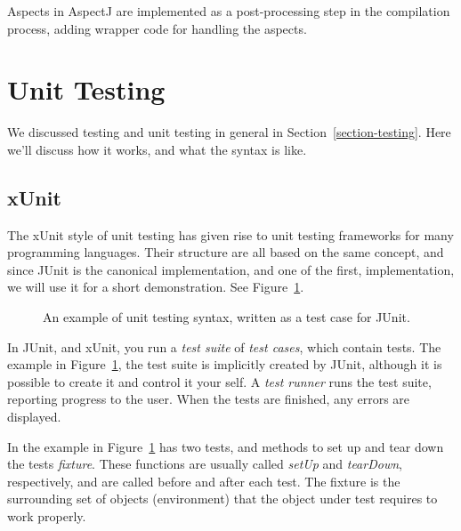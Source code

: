 \documentclass[a4paper,11pt]{kth-mag}
\begin{document}
Aspects in AspectJ are implemented as a post-processing step in the compilation
process, adding wrapper code for handling the aspects.


\section{Unit Testing} \label{section-unit-testing}

We discussed testing and unit testing in general in
Section~\ref{section-testing}. Here we'll discuss how it works, and what the
syntax is like.


\subsection{xUnit}

The xUnit style of unit testing \cite{fowlerxunit} has given rise to unit
testing frameworks for many programming languages. Their structure are all
based on the same concept, and since JUnit is the canonical implementation, and
one of the first, implementation, we will use it for a short demonstration. See
Figure~\ref{figure-junit}.

\begin{figure}[h!]
	\begin{center}
	\begin{minipage}{0.7\textwidth}
		\lstset{language=Java}
		
	\end{minipage}
	\end{center}
	\caption{An example of unit testing syntax, written as a test case for JUnit.}
	\label{figure-junit}
\end{figure}

In JUnit, and xUnit, you run a \textit{test suite} of \textit{test cases},
which contain tests. The example in Figure~\ref{figure-junit}, the test suite
is implicitly created by JUnit, although it is possible to create it and
control it your self. A \textit{test runner} runs the test suite, reporting
progress to the user.  When the tests are finished, any errors are displayed.

In the example in Figure~\ref{figure-junit} has two tests, and methods to set
up and tear down the tests \textit{fixture}. These functions are usually called
\textit{setUp} and \textit{tearDown}, respectively, and are called before and
after each test. The fixture is the surrounding set of objects (environment)
that the object under test requires to work properly.
\end{document}
